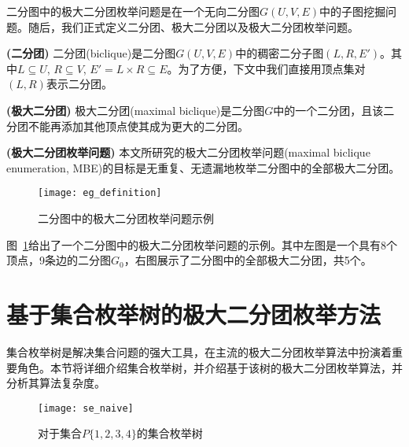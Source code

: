   二分图中的极大二分团枚举问题是在一个无向二分图$G(U,V,E)$中的子图挖掘问题。随后，我们正式定义二分团、极大二分团以及极大二分团枚举问题。

\begin{definition}
  \textbf{(二分团)} 二分团(biclique)是二分图$G(U,V,E)$中的稠密二分子图$(L,R,E')$。其中$L\subseteq U$, $R\subseteq V$, $E' = L \times R \subseteq E$。为了方便，下文中我们直接用顶点集对$(L,R)$表示二分团。
\end{definition}

\begin{definition}
  \textbf{(极大二分团)} 极大二分团(maximal biclique)是二分图$G$中的一个二分团，且该二分团不能再添加其他顶点使其成为更大的二分团。
  \label{def:mb}
\end{definition}

\begin{definition}
  \textbf{(极大二分团枚举问题)} 本文所研究的极大二分团枚举问题(maximal biclique enumeration, MBE)的目标是无重复、无遗漏地枚举二分图中的全部极大二分团。
\end{definition}

\begin{figure} [ht]
  \vspace{0.2 in}
  \centering
  \texttt{[image: eg\_definition]}
  \vspace{0.1 in}
  \caption{二分图中的极大二分团枚举问题示例}
  \label{fig:eg_definition}
\end{figure}

\begin{example}
  图~\ref{fig:eg_definition}给出了一个二分图中的极大二分团枚举问题的示例。其中左图是一个具有8个顶点，9条边的二分图$G_0$，右图展示了二分图中的全部极大二分团，共5个。
  
\end{example}

\section{基于集合枚举树的极大二分团枚举方法}
\label{sec:se}


集合枚举树是解决集合问题的强大工具，在主流的极大二分团枚举算法中扮演着重要角色。本节将详细介绍集合枚举树，并介绍基于该树的极大二分团枚举算法，并分析其算法复杂度。


\begin{figure} [ht]
  \vspace{0.1 in}
  \centering
  \texttt{[image: se\_naive]}
  \vspace{0.05 in}
  \caption{对于集合$P\{1,2,3,4\}$的集合枚举树}
  \label{fig:se_naive}
\end{figure}


